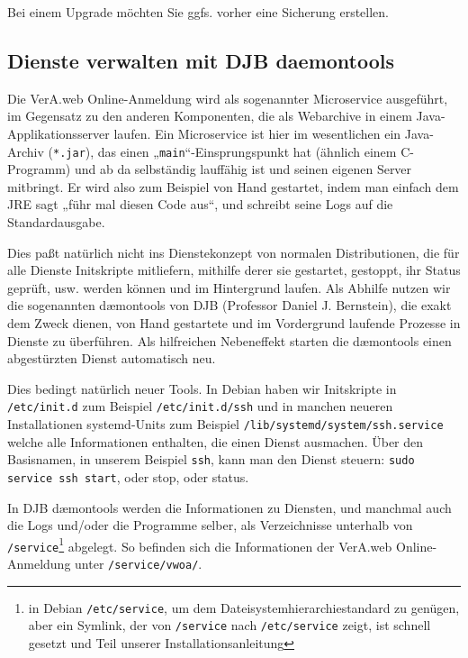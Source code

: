 Bei einem Upgrade möchten Sie ggfs. vorher eine Sicherung erstellen.

\ifoa

\subsection{Dienste verwalten mit DJB daemontools}\label{subsec:intro-svc}

Die VerA.web Online-Anmeldung wird als sogenannter Microservice
ausgeführt, im Gegensatz zu den anderen Komponenten, die als
Webarchive in einem Java-Applikationsserver laufen. Ein Microservice
ist hier im wesentlichen ein Java-Archiv (\texttt{*.jar}), das einen
„\texttt{main}“-Einsprungspunkt hat (ähnlich einem C-Programm) und ab
da selbständig lauffähig ist und seinen eigenen Server mitbringt. Er
wird also zum Beispiel von Hand gestartet, indem man einfach dem JRE
sagt „führ mal diesen Code aus“, und schreibt seine Logs auf die
Standardausgabe.

Dies paßt natürlich nicht ins Dienstekonzept von normalen Distributionen,
die für alle Dienste Initskripte mitliefern, mithilfe derer sie gestartet,
gestoppt, ihr Status geprüft, usw. werden können und im Hintergrund laufen.
Als Abhilfe nutzen wir die sogenannten dæmontools von DJB (Professor Daniel
J. Bernstein), die exakt dem Zweck dienen, von Hand gestartete und im
Vordergrund laufende Prozesse in Dienste zu überführen. Als hilfreichen
Nebeneffekt starten die dæmontools einen abgestürzten Dienst automatisch neu.

Dies bedingt natürlich neuer Tools. In Debian haben wir Initskripte in
\texttt{/etc/init.d} \dash zum Beispiel \texttt{/etc/init.d/ssh} \dash
und in manchen neueren Installationen systemd-Units \dash zum Beispiel
\texttt{/lib/systemd/system/ssh.service} \dash welche alle Informationen
enthalten, die einen Dienst ausmachen. Über den Basisnamen, in unserem
Beispiel \texttt{ssh}, kann man den Dienst steuern: \texttt{sudo service
ssh start}, oder stop, oder status.

In DJB dæmontools werden die Informationen zu Diensten, und manchmal auch
die Logs und/oder die Programme selber, als Verzeichnisse unterhalb von
\texttt{/service}\Hair\footnote{in Debian \texttt{/etc/service}, um dem
Dateisystemhierarchiestandard zu genügen, aber ein Symlink, der von
\texttt{/service} nach \texttt{/etc/service} zeigt, ist schnell gesetzt
und Teil unserer Installationsanleitung} abgelegt. So befinden sich die
Informationen der VerA.web Online-Anmeldung unter \texttt{/service/vwoa/}.

